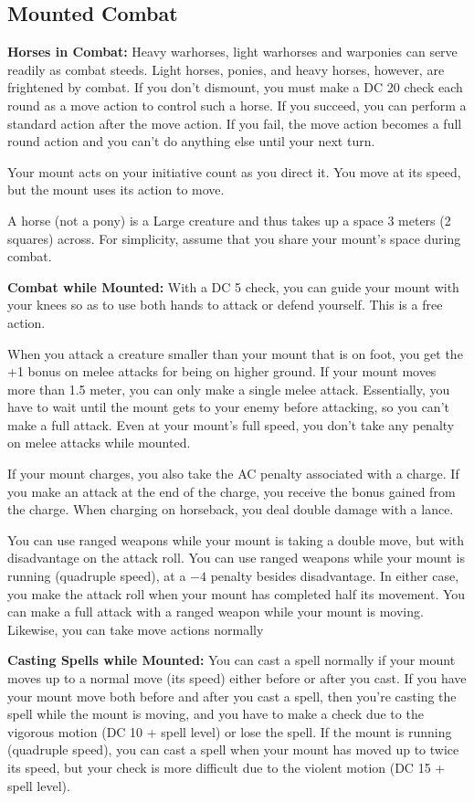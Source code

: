 \subsection{Mounted Combat}
\textbf{Horses in Combat:} Heavy warhorses, light warhorses and warponies can serve readily as combat steeds. Light horses, ponies, and heavy horses, however, are frightened by combat. If you don't dismount, you must make a DC 20  check each round as a move action to control such a horse. If you succeed, you can perform a standard action after the move action. If you fail, the move action becomes a full round action and you can't do anything else until your next turn.

Your mount acts on your initiative count as you direct it. You move at its speed, but the mount uses its action to move.

A horse (not a pony) is a Large creature and thus takes up a space 3 meters (2 squares) across. For simplicity, assume that you share your mount's space during combat.

\textbf{Combat while Mounted:} With a DC 5  check, you can guide your mount with your knees so as to use both hands to attack or defend yourself. This is a free action.

When you attack a creature smaller than your mount that is on foot, you get the +1 bonus on melee attacks for being on higher ground. If your mount moves more than 1.5 meter, you can only make a single melee attack. Essentially, you have to wait until the mount gets to your enemy before attacking, so you can't make a full attack. Even at your mount's full speed, you don't take any penalty on melee attacks while mounted.

If your mount charges, you also take the AC penalty associated with a charge. If you make an attack at the end of the charge, you receive the bonus gained from the charge. When charging on horseback, you deal double damage with a lance.

You can use ranged weapons while your mount is taking a double move, but with disadvantage on the attack roll. You can use ranged weapons while your mount is running (quadruple speed), at a $-4$ penalty besides disadvantage. In either case, you make the attack roll when your mount has completed half its movement. You can make a full attack with a ranged weapon while your mount is moving. Likewise, you can take move actions normally

\textbf{Casting Spells while Mounted:} You can cast a spell normally if your mount moves up to a normal move (its speed) either before or after you cast. If you have your mount move both before and after you cast a spell, then you're casting the spell while the mount is moving, and you have to make a  check due to the vigorous motion (DC 10 + spell level) or lose the spell. If the mount is running (quadruple speed), you can cast a spell when your mount has moved up to twice its speed, but your  check is more difficult due to the violent motion (DC 15 + spell level).

